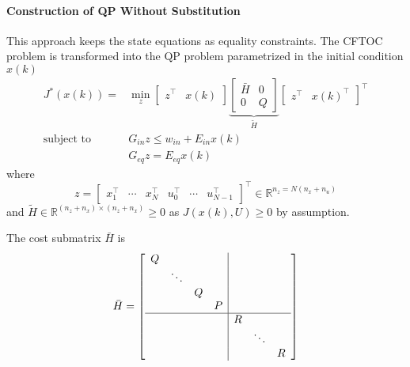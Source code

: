 \paragraph{Construction of QP Without Substitution}\label{cftoc_QP_without_subs}

This approach keeps the state equations as equality constraints. The CFTOC problem is transformed into the QP problem parametrized in the initial condition $x(k)$  %
\begin{align*}
    J^*(x(k)) =            & \min_{z}\begin{bmatrix}
                                         z^\top & x(k)
                                     \end{bmatrix}
    \underbrace{\begin{bmatrix}
                        \bar{H} & 0 \\
                        0       & Q
                    \end{bmatrix}}_{\tilde{H}}
    \begin{bmatrix}
        z^\top & {x(k)}^\top
    \end{bmatrix}^\top                                       \\
    \text{subject to}\quad & G_{in} z \leq w_{in} +E_{in} x(k) \\
                           & G_{eq} z = E_{eq} x(k)
\end{align*}
where
\begin{equation*}
    z = \begin{bmatrix}
        x_1^\top & \cdots & x_N^\top & u_0^\top & \cdots & u_{N-1}^\top
    \end{bmatrix}^\top \in \mathbb{R}^{n_z = N(n_x + n_u)}
\end{equation*}
and $\tilde{H}\in \mathbb{R}^{(n_z+n_x) \times (n_z+n_x)} \geq 0$ as $J(x(k),U) \geq 0$ by assumption. %

\newpar{}

The cost submatrix $\bar{H}$ is
\begin{equation*}
    \bar{H} = \left[
        \begin{array}{cccc|cccc} %
            Q &        &   &   &   &        &   \\
              & \ddots &   &   &   &        &   \\
              &        & Q &   &   &        &   \\
              &        &   & P &   &        &   \\
            \hline %
              &        &   &   & R &        &   \\
              &        &   &   &   & \ddots &   \\
              &        &   &   &   &        & R
        \end{array}
        \right]
\end{equation*}

